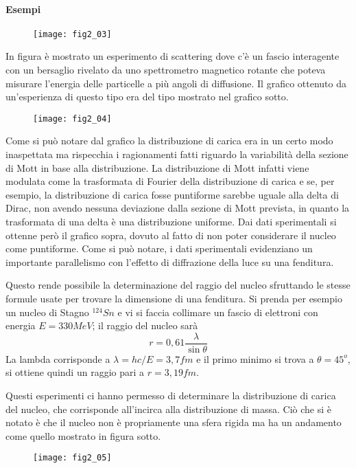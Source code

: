 \paragraph{Esempi}
\begin{figure}[h]
\centering
\texttt{[image: fig2\_03]}
\end{figure}
In figura è mostrato un esperimento di scattering dove c'è un fascio interagente con un bersaglio rivelato da uno spettrometro magnetico rotante che poteva misurare l'energia delle particelle a più angoli di diffusione. Il grafico ottenuto da un'esperienza di questo tipo era del tipo mostrato nel grafico sotto.
\begin{figure}[h]
\centering
\texttt{[image: fig2\_04]}
\end{figure}
Come si può notare dal grafico la distribuzione di carica era in un certo modo inaspettata ma rispecchia i ragionamenti fatti riguardo la variabilità della sezione di Mott in base alla distribuzione.
La distribuzione di Mott infatti viene modulata come la trasformata di Fourier della distribuzione di carica e se, per esempio, la distribuzione di carica fosse puntiforme sarebbe uguale alla delta di Dirac, non avendo nessuna deviazione dalla sezione di Mott prevista, in quanto la trasformata di una delta è una distribuzione uniforme. 
Dai dati sperimentali si ottenne però il grafico sopra, dovuto al fatto di non poter considerare il nucleo come puntiforme.
Come si può notare, i dati sperimentali evidenziano un importante parallelismo con l'effetto di diffrazione della luce su una fenditura.

Questo rende possibile la determinazione del raggio del nucleo sfruttando le stesse formule usate per trovare la dimensione di una fenditura.
Si prenda per esempio un nucleo di Stagno $^{124}Sn$ e vi si faccia collimare un fascio di elettroni con energia $E=330MeV$;
il raggio del nucleo sarà
\begin{equation}
r=0,61 \frac{\lambda}{\sin\theta}
\end{equation} 
La lambda corrisponde a $\lambda=hc/E=3,7fm$ e il primo minimo si trova a $\theta=45^o$, si ottiene quindi un raggio pari a $r=3,19fm$.

Questi esperimenti ci hanno permesso di determinare la distribuzione di carica del nucleo, che corrisponde all'incirca alla distribuzione di massa.
Ciò che si è notato è che il nucleo non è propriamente una sfera rigida ma ha un andamento come quello mostrato in figura sotto.
\begin{figure}[h]
\centering
\texttt{[image: fig2\_05]}
\end{figure}

